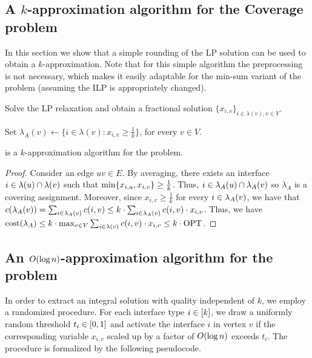 

\subsection{A $k$-approximation algorithm for the Coverage problem}
In this section we show that a simple rounding of the LP solution can be used to obtain a $k$-approximation. Note that for this simple algorithm the preprocessing is not necessary, which makes it easily adaptable for the min-sum variant of the \coverage problem (assuming the ILP is appropriately changed).

\begin{algorithm}[H]
\caption{$k$-approximation algorithm} \label{alg:2}%
Solve the LP relaxation and obtain a fractional solution $\{x_{i, v}\}_{i\in\lambda(v), v\in V}$.

Set $\lambda_A(v) \gets \{i \in \lambda(v) \colon x_{i, v} \geq \frac{1}{k}\}$, for every $v \in V$.

\end{algorithm}

\begin{theorem}
 is a $k$-approximation algorithm for the \coverage problem.
\end{theorem}

\begin{proof}
Consider an edge $uv\in E$. By averaging, there exists an interface $i\in\lambda\mathopen{}\left( u \right)\cap\lambda\mathopen{}\left( v \right)$ such that $\min\mathopen{}\left\{ x_{i, u}, x_{i, v} \right\} \geq \frac{1}{k}$. Thus, $i\in\lambda_A\mathopen{}\left( u \right)\cap\lambda_A\mathopen{}\left( v \right)$ so $\lambda_A$ is a covering assignment. Moreover, since $x_{i, v} \geq \frac{1}{k}$ for every $i\in\lambda_A\mathopen{}\left( v \right)$, we have that $c\mathopen{}\left( \lambda_A\mathopen{}\left( v \right) \right) = \sum_{i\in\lambda_A\mathopen{}\left( v \right)}c\mathopen{}\left( i, v \right) \leq k \cdot \sum_{i\in\lambda_A\mathopen{}\left( v \right)}c\mathopen{}\left( i, v \right) \cdot x_{i, v}$. Thus, we have $\textnormal{cost}\mathopen{}\left( \lambda_A \right) \leq k \cdot \max_{v\in V}\sum_{i\in\lambda\mathopen{}\left( v \right)} c\mathopen{}\left( i, v \right) \cdot x_{i, v} \leq k \cdot \textnormal{OPT}$.
\end{proof}


\subsection{An $O\mathopen{}\left( \log n \right)$-approximation algorithm for the \coverage problem}
In order to extract an integral solution with quality independent of $k$, we employ a randomized procedure. For each interface type $i\in\mathopen{}\left[ k \right]$, we draw a uniformly random threshold $t_i \in \mathopen{}\left[ 0, 1 \right]$ and activate the interface $i$ in vertex $v$ if the corresponding variable $x_{i,v}$ scaled up by a factor of $O\mathopen{}\left( \log n \right)$ exceeds $t_i$. The procedure is formalized by the following pseudocode.

